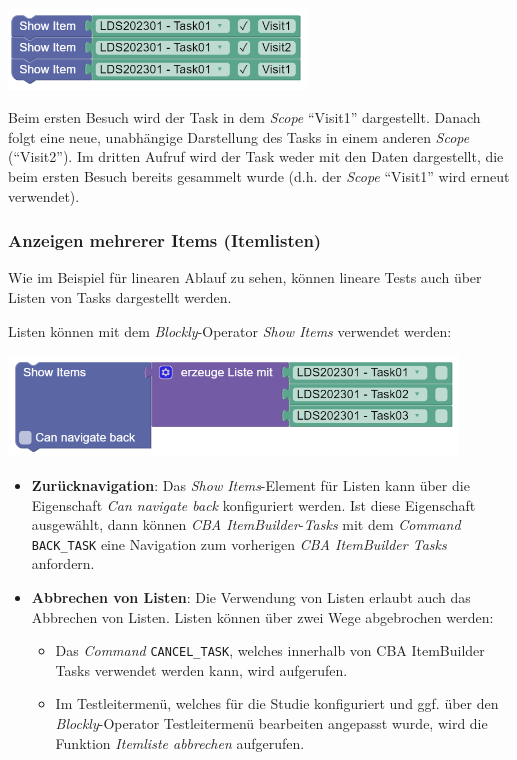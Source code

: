 \documentclass[
  letterpaper,
  DIV=11]{scrreprt}
\providecommand{\tightlist}{%
  \setlength{\itemsep}{0pt}\setlength{\parskip}{0pt}}\usepackage{longtable,booktabs,array}
\begin{document}
\begin{tcolorbox}
\includegraphics[width=3.125in,height=\textheight]{img/screenshot-item-element-with-scope-lds2003-01-example-01-ENG.png}

Beim ersten Besuch wird der Task in dem \emph{Scope} ``Visit1''
dargestellt. Danach folgt eine neue, unabhängige Darstellung des Tasks
in einem anderen \emph{Scope} (``Visit2''). Im dritten Aufruf wird der
Task weder mit den Daten dargestellt, die beim ersten Besuch bereits
gesammelt wurde (d.h. der \emph{Scope} ``Visit1'' wird erneut
verwendet).

\hypertarget{anzeigen-mehrerer-items-itemlisten-1}{%
\subsubsection{Anzeigen mehrerer Items
(Itemlisten)}\label{anzeigen-mehrerer-items-itemlisten-1}}

Wie im Beispiel für linearen Ablauf zu sehen, können lineare Tests auch
über Listen von Tasks dargestellt werden.

Listen können mit dem \emph{Blockly}-Operator \emph{Show Items}
verwendet werden:

\includegraphics[width=4.6875in,height=\textheight]{img/screenshot-show-items-list-lds2023-01-example-01-DEU.png}

\begin{itemize}
\item
  \textbf{Zurücknavigation}: Das \emph{Show Items}-Element für Listen
  kann über die Eigenschaft \emph{Can navigate back} konfiguriert
  werden. Ist diese Eigenschaft ausgewählt, dann können \emph{CBA
  ItemBuilder}-\emph{Tasks} mit dem \emph{Command} \texttt{BACK\_TASK}
  eine Navigation zum vorherigen \emph{CBA ItemBuilder Tasks} anfordern.
\item
  \textbf{Abbrechen von Listen}: Die Verwendung von Listen erlaubt auch
  das Abbrechen von Listen. Listen können über zwei Wege abgebrochen
  werden:

  \begin{itemize}
  \tightlist
  \item
    Das \emph{Command} \texttt{CANCEL\_TASK}, welches innerhalb von CBA
    ItemBuilder Tasks verwendet werden kann, wird aufgerufen.
  \item
    Im Testleitermenü, welches für die Studie konfiguriert und ggf. über
    den \emph{Blockly}-Operator Testleitermenü bearbeiten angepasst
    wurde, wird die Funktion \emph{Itemliste abbrechen} aufgerufen.
  \end{itemize}
\end{itemize}


\end{tcolorbox}
\end{document}
